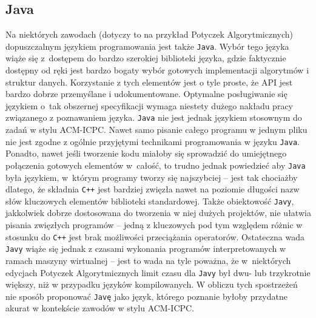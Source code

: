 \subsection{Java}
Na niektórych zawodach (dotyczy to na przykład Potyczek Algorytmicznych)
dopuszczalnym językiem programowania jest także \texttt{Java}. Wybór tego języka
wiąże się z~dostępem do bardzo szerokiej biblioteki języka, gdzie faktycznie
dostępny od ręki jest bardzo bogaty wybór gotowych implementacji algorytmów
i struktur danych. Korzystanie z tych elementów jest o tyle proste, że API jest
bardzo dobrze przemyślane i udokumentowane. Optymalne posługiwanie się językiem
o~tak obszernej specyfikacji wymaga niestety dużego nakładu pracy związanego
z poznawaniem języka.
\texttt{Java} nie jest jednak językiem stosownym do zadań w stylu ACM-ICPC.
Nawet samo pisanie całego programu w jednym pliku nie jest zgodne z ogólnie
przyjętymi technikami programowania w języku \texttt{Java}.
Ponadto, nawet jeśli tworzenie kodu miałoby się sprowadzić do umiejętnego
połączenia gotowych elementów w~całość, to trudno jednak powiedzieć aby
\texttt{Java} była językiem, w~którym programy tworzy się najszybciej -- jest
tak chociażby dlatego, że składnia \texttt{C++} jest bardziej zwięzła nawet na
poziomie długości nazw słów kluczowych elementów biblioteki standardowej.
Także obiektowość \texttt{Javy}, jakkolwiek dobrze dostosowana do tworzenia
w niej dużych projektów, nie ułatwia pisania zwięzłych programów -- jedną
z kluczowych pod tym względem różnic w stosunku do \texttt{C++} jest brak
możliwości przeciążania operatorów. Ostateczna wada \texttt{Javy}
wiąże się jednak z czasami wykonania programów interpretowanych w ramach
maszyny wirtualnej -- jest to wada na tyle poważna, że w~niektórych edycjach
Potyczek Algorytmicznych limit czasu dla \texttt{Javy} był dwu- lub trzykrotnie
większy, niż w przypadku języków kompilowanych. W obliczu tych spostrzeżeń nie
sposób proponować \texttt{Javę} jako język, którego poznanie byłoby przydatne
akurat w kontekście zawodów w stylu ACM-ICPC.

